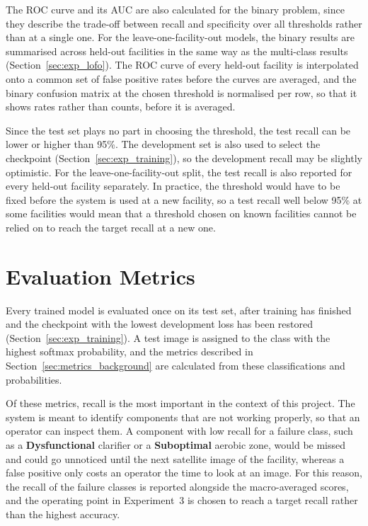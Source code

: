 The ROC curve and its AUC are also calculated for the binary problem, since they describe the trade-off between recall and specificity over all thresholds rather than at a single one. For the leave-one-facility-out models, the binary results are summarised across held-out facilities in the same way as the multi-class results (Section~\ref{sec:exp_lofo}). The ROC curve of every held-out facility is interpolated onto a common set of false positive rates before the curves are averaged, and the binary confusion matrix at the chosen threshold is normalised per row, so that it shows rates rather than counts, before it is averaged.

Since the test set plays no part in choosing the threshold, the test recall can be lower or higher than 95\%. The development set is also used to select the checkpoint (Section~\ref{sec:exp_training}), so the development recall may be slightly optimistic. For the leave-one-facility-out split, the test recall is also reported for every held-out facility separately. In practice, the threshold would have to be fixed before the system is used at a new facility, so a test recall well below 95\% at some facilities would mean that a threshold chosen on known facilities cannot be relied on to reach the target recall at a new one.


\section{Evaluation Metrics}
\label{sec:exp_metrics}

Every trained model is evaluated once on its test set, after training has finished and the checkpoint with the lowest development loss has been restored (Section~\ref{sec:exp_training}). A test image is assigned to the class with the highest softmax probability, and the metrics described in Section~\ref{sec:metrics_background} are calculated from these classifications and probabilities.

Of these metrics, recall is the most important in the context of this project. The system is meant to identify components that are not working properly, so that an operator can inspect them. A component with low recall for a failure class, such as a \textbf{Dysfunctional} clarifier or a \textbf{Suboptimal} aerobic zone, would be missed and could go unnoticed until the next satellite image of the facility, whereas a false positive only costs an operator the time to look at an image. For this reason, the recall of the failure classes is reported alongside the macro-averaged scores, and the operating point in Experiment~3 is chosen to reach a target recall rather than the highest accuracy.


